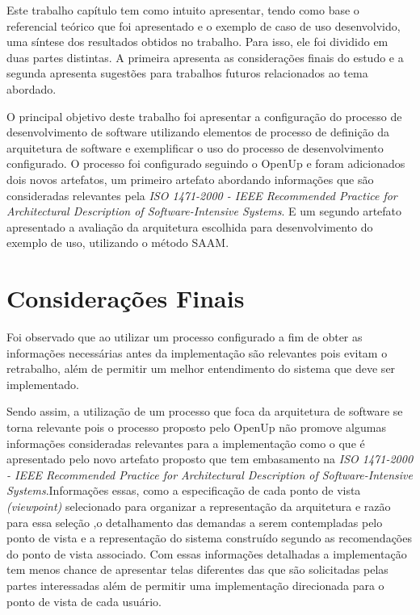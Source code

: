 Este trabalho capítulo tem como intuito apresentar, tendo como base o referencial teórico que foi apresentado e o exemplo de caso de uso desenvolvido, uma síntese dos resultados obtidos no trabalho. Para isso, ele foi dividido em duas partes distintas. A primeira apresenta as considerações finais do estudo e a segunda apresenta sugestões para trabalhos futuros relacionados ao tema abordado.

O principal objetivo deste trabalho foi apresentar a configuração do processo de desenvolvimento de software utilizando elementos de processo de definição da arquitetura de software e exemplificar o uso do processo de desenvolvimento configurado. O processo foi configurado seguindo o \acrfull{OpenUp} e foram adicionados dois novos artefatos, um primeiro artefato abordando informações que são consideradas relevantes pela \emph{ISO 1471-2000 - IEEE Recommended Practice for Architectural Description of Software-Intensive Systems}. E um segundo artefato apresentado a avaliação da arquitetura escolhida para desenvolvimento do exemplo de uso, utilizando o método \acrfull{SAAM}.
 
\section{Considerações Finais}
Foi observado que ao utilizar um processo configurado a fim de obter as informações necessárias antes da implementação são relevantes pois evitam o retrabalho, além de permitir um melhor entendimento do sistema que deve ser implementado.

Sendo assim, a utilização de um processo que foca da arquitetura de software se torna relevante pois o processo proposto pelo \acrfull{OpenUp} não promove algumas informações consideradas relevantes para a implementação como o que é apresentado pelo novo artefato proposto que tem embasamento na \emph{ISO 1471-2000 - IEEE Recommended Practice for Architectural Description of Software-Intensive Systems}.Informações essas, como a especificação de cada ponto de vista \emph{(viewpoint)} selecionado para organizar a representação da arquitetura e razão para essa seleção ,o detalhamento das demandas a serem contempladas pelo ponto de vista e a representação do sistema construído segundo as recomendações do ponto de vista
associado. Com essas informações detalhadas a implementação tem menos chance de apresentar telas diferentes das que são solicitadas pelas partes interessadas além de permitir uma implementação direcionada para o ponto de vista de cada usuário.

